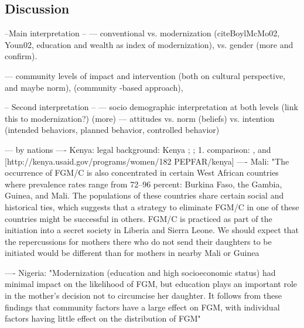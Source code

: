 \documentclass[12pt,]{article}
\begin{document}
\subsection{Discussion}\label{Discussion}

--Main interpretation --
--- conventional \cite{FreyJohn07, Hayf05, Mack96, ShelWand11} vs. modernization (cite{BoylMcMo02, Youn02}, education and wealth as index of modernization), vs. gender \cite{Dell04, FrieMahm13, Lewi04, Meye00, Njam04, YirgKass12, Youn02} (more and confirm).  

--- community levels of impact and intervention
\cite{Drot11, Grue05, JoneEhir04} (both on cultural perspective, and maybe norm), 
\cite{ChegAske04}(community -based approach), \cite{BrowBeec13,PatrSing15}

-- Second interpretation --
--- socio demographic interpretation at both levels (link this to modernization?)
\cite{Hayf05, PashPonn16} (more)
--- attitudes vs. norm (beliefs) vs. intention (intended behaviors, planned behavior, controlled behavior) \cite{Ajze02, ThomMadd92}


--- by nations
---- Kenya: legal background:  Kenya \cite{GKEN01}; \cite{UNIC13}; 
1. comparison: \cite{Chia14, Hayf05}, and [http://kenya.usaid.gov/programs/women/182 PEPFAR/kenya]
---- Mali: "The occurrence of FGM/C is also concentrated in certain West African countries where prevalence rates range from 72–96 percent: Burkina Faso, the Gambia, Guinea, and Mali. The populations of these countries share certain social and historical ties, which suggests that a strategy to eliminate FGM/C in one of these countries might be successful in others. FGM/C is practiced as part of the initiation into a secret society in Liberia and Sierra Leone. We should expect that the repercussions for mothers there who do not send their daughters to be initiated would be different than for mothers in nearby Mali or Guinea \cite{YodaWang13}

---- Nigeria: "Modernization (education and high socioeconomic status) had minimal impact on the likelihood of FGM, but education plays an important role in the mother's decision not to circumcise her daughter. It follows from these findings that community factors have a large effect on FGM, with individual factors having little effect on the distribution of FGM" \cite{KandNwak09}
\end{document}
